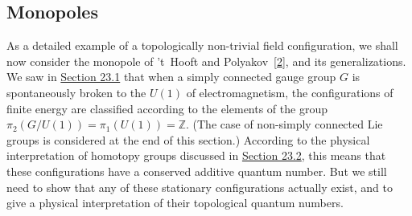 \subsection{Monopoles}
\label{sec:23.3}

As a detailed example of a topologically non-trivial field configuration,
we shall now consider the monopole of 't~Hooft and
Polyakov~\hyperref[ch23-ref-2]{[2]}, and its generalizations. We saw in
\hyperref[sec:23.1]{Section 23.1} that when a simply connected gauge group
$G$ is spontaneously broken to the $U(1)$ of electromagnetism, the
configurations of finite energy are classified according to the elements
of the group
$\pi_2(G/U(1))=\pi_1(U(1))=\mathbb Z$. (The case of non-simply connected
Lie groups is considered at the end of this section.) According to the
physical interpretation of homotopy groups discussed in
\hyperref[sec:23.2]{Section 23.2}, this means that these configurations
have a conserved additive quantum number. But we still need to show that
any of these stationary configurations actually exist, and to give a
physical interpretation of their topological quantum numbers.

